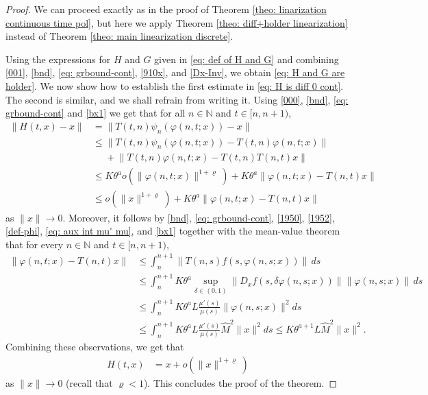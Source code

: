\documentclass[reqno, a4paper, 10pt]{amsart}
\theoremstyle{plain}
\numberwithin{equation}{section}
\theoremstyle{remark}
\renewcommand{\phi}{\varphi}
\def\N{\mathbb{N}}
\begin{document}
\begin{proof}
We can proceed exactly as in the proof of Theorem \ref{theo: linarization continuous time pol}, but here we apply Theorem \ref{theo: diff+holder linearization} instead of Theorem \ref{theo: main linearization discrete}.

Using the expressions for $H$ and $G$ given in \eqref{eq: def of H and G} and combining \eqref{001}, \eqref{bnd}, \eqref{eq: grbound-cont}, \eqref{910x}, and \eqref{Dx-Inv}, we obtain \eqref{eq: H and G are holder}. We now show how to establish the first estimate in \eqref{eq: H is diff 0 cont}. The second is similar, and we shall refrain from writing it. Using \eqref{000}, \eqref{bnd}, \eqref{eq: grbound-cont} and \eqref{bx1} we get that for all $n\in \N$ and $t \in [n,n+1)$,
\begin{align*}
\lVert H(t,x)-x\rVert
&=\lVert T(t,n)\psi_n(\varphi(n,t;x))-x\rVert\\
&\le
\lVert T(t,n)\psi_n(\varphi(n,t;x)) -T(t,n)\varphi(n,t;x)\rVert\\
& 
\phantom{\le}+\lVert T(t,n)\varphi(n,t;x)-T(t,n)T(n,t)x\rVert\\
&\le
K\theta^a o(\lVert \varphi(n, t;x)\rVert^{1+ \varrho})
+K\theta^a  \lVert \phi(n,t;x)-T(n,t)x\rVert \\
&\le o(\lVert x\rVert^{1+ \varrho})
+K\theta^a \lVert \phi(n,t;x)-T(n,t)x\rVert
\end{align*}
as $\|x\|\to 0$. Moreover, it follows by \eqref{bnd}, \eqref{eq: grbound-cont}, \eqref{1950}, \eqref{1952}, \eqref{def-phi}, \eqref{eq: aux int mu' mu}, and \eqref{bx1} together with the mean-value theorem that for every $n\in \N$ and $t \in [n,n+1)$,
\[
\begin{split}
\lVert \varphi(n,t;x)-T(n,t)x\rVert
&\le \int_n^{n+1}\lVert T(n,s)f(s, \varphi(n,s;x))\rVert\, ds
\\
&\le \int_n^{n+1} K\theta^a   \sup_{\delta \in (0,1)}\|D_xf(s, \delta \varphi(n,s;x))\|\|\varphi(n,s;x)\|\,ds
\\
&\le \int_n^{n+1} K\theta^a L \frac{\mu'(s)}{\mu(s)}
\|\varphi(n,s; x)\|^2 ds
\\
&\le \int_n^{n+1}K\theta^a L \frac{\mu'(s)}{\mu(s)} \hat M ^2 \|x\|^2 ds
\le K\theta^{a+1}L \hat M ^2 \lVert x\rVert^2.
\end{split}
\]
Combining these observations, we get that
\[
\begin{split}
H(t,x)&=x+ o(\lVert x\rVert^{1+ \varrho})
\end{split}
\]
as $\|x\|\to 0$ (recall that $\varrho<1$). This concludes the proof of the theorem.
\end{proof}
\end{document}
